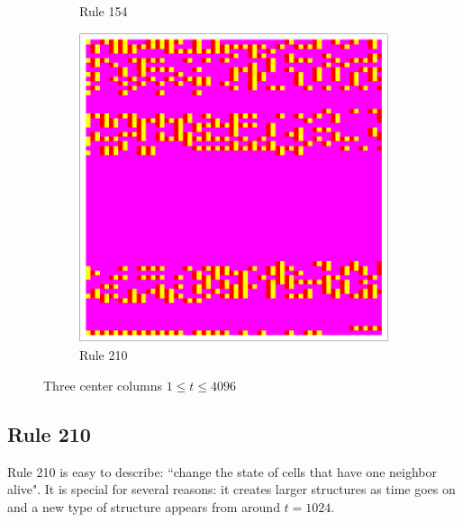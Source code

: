 \documentclass{article}
\begin{document}
\begin{figure}[H]
\begin{subfigure}[b]{0.135\textwidth}
        \vspace{-16pt}\caption*{Rule 154}
        \label{fig:rule-154-center_columns-4096}
    \end{subfigure}
    \begin{subfigure}[b]{0.135\textwidth}
        \centering
        \includegraphics[width=\textwidth]{graphics/behavior/center-columns/rule-210-center_columns-4096.pdf}
        \vspace{-16pt}\caption*{Rule 210}
        \label{fig:rule-210-center_columns-4096}
    \end{subfigure}
       \caption{Three center columns $1\leq t \leq 4096$}
       \label{fig:center-columns}
\end{figure}

\pagebreak
\subsection{Rule 210} \label{rule-210}
Rule 210 is easy to describe: ``change the state of cells that have one neighbor alive". It is special for several reasons: it creates larger structures as time goes on and a new type of structure appears from around $t=1024$.
\end{document}

